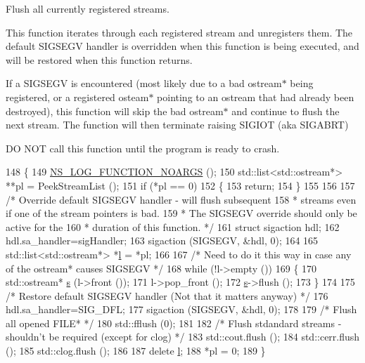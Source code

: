 Flush all currently registered streams. 

This function iterates through each registered stream and unregisters them. The default {\ttfamily S\+I\+G\+S\+E\+GV} handler is overridden when this function is being executed, and will be restored when this function returns.

If a {\ttfamily S\+I\+G\+S\+E\+GV} is encountered (most likely due to a bad {\ttfamily ostream$\ast$} being registered, or a registered {\ttfamily osteam$\ast$} pointing to an {\ttfamily ostream} that had already been destroyed), this function will skip the bad {\ttfamily ostream$\ast$} and continue to flush the next stream. The function will then terminate raising {\ttfamily S\+I\+G\+I\+OT} (aka {\ttfamily S\+I\+G\+A\+B\+RT})

DO N\+OT call this function until the program is ready to crash. 
\begin{DoxyCode}
148 \{
149   \hyperlink{log-macros-disabled_8h_a8f7e4afc291c9d29a65c18ac1f79197b}{NS\_LOG\_FUNCTION\_NOARGS} ();
150   std::list<std::ostream*> **pl = PeekStreamList ();
151   \textcolor{keywordflow}{if} (*pl == 0)
152     \{
153       \textcolor{keywordflow}{return};
154     \}
155 
156 
157   \textcolor{comment}{/* Override default SIGSEGV handler - will flush subsequent}
158 \textcolor{comment}{   * streams even if one of the stream pointers is bad.}
159 \textcolor{comment}{   * The SIGSEGV override should only be active for the}
160 \textcolor{comment}{   * duration of this function. */}
161   \textcolor{keyword}{struct }sigaction hdl;
162   hdl.sa\_handler=sigHandler;
163   sigaction (SIGSEGV, &hdl, 0);
164 
165   std::list<std::ostream*> *\hyperlink{buildings__pathloss_8m_a5b54c0a045f179bcbbbc9abcb8b5cd4c}{l} = *pl;
166 
167   \textcolor{comment}{/* Need to do it this way in case any of the ostream* causes SIGSEGV */}
168   \textcolor{keywordflow}{while} (!l->empty ())
169     \{
170       std::ostream* \hyperlink{generate__test__data__lte__sinr_8m_ad83eeb3a142285d1243a08c6b7026df8}{s} (l->front ());
171       l->pop\_front ();
172       \hyperlink{generate__test__data__lte__sinr_8m_ad83eeb3a142285d1243a08c6b7026df8}{s}->flush ();
173     \}
174 
175   \textcolor{comment}{/* Restore default SIGSEGV handler (Not that it matters anyway) */}
176   hdl.sa\_handler=SIG\_DFL;
177   sigaction (SIGSEGV, &hdl, 0);
178 
179   \textcolor{comment}{/* Flush all opened FILE* */}
180   std::fflush (0);
181 
182   \textcolor{comment}{/* Flush stdandard streams - shouldn't be required (except for clog) */}
183   std::cout.flush ();
184   std::cerr.flush ();
185   std::clog.flush ();
186 
187   \textcolor{keyword}{delete} \hyperlink{buildings__pathloss_8m_a5b54c0a045f179bcbbbc9abcb8b5cd4c}{l};
188   *pl = 0;
189 \}
\end{DoxyCode}


